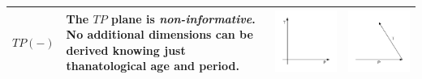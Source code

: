 \documentclass[
  12pt
]{scrartcl}
\begin{document}
\begin{center}
\begin{longtable}{m{}m{}m{}m{}}
  \midrule
  $TP(-)$ &
  The $TP$ plane is \emph{non-informative}. No additional dimensions can be derived knowing just thanatological age and period. &
  \includegraphics[width = \linewidth]{../fig/TP.pdf} &
  \includegraphics[width = \linewidth]{../fig/TP_iso.pdf}  \\
  \bottomrule
  \end{longtable}
\end{center}

\clearpage
\end{document}
